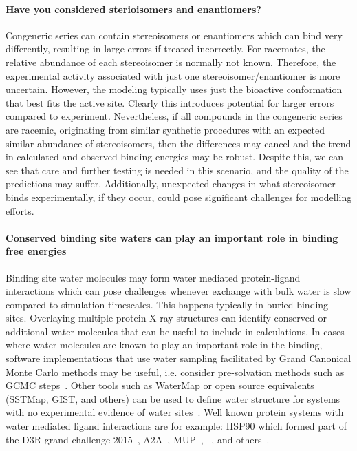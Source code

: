 \documentclass[9pt,bestpractices]{livecoms}
\begin{document}
\paragraph{Have you considered sterioisomers and enantiomers?}
Congeneric series can contain stereoisomers or enantiomers which can bind very differently, resulting in large errors if treated incorrectly. For racemates, the relative abundance of each stereoisomer is normally not known. Therefore, the experimental activity associated with just one stereoisomer/enantiomer is more uncertain. However, the modeling typically uses just the bioactive conformation that best fits the active site. Clearly this introduces potential for larger errors compared to experiment. Nevertheless, if all compounds in the congeneric series are racemic, originating from similar synthetic procedures with an expected similar abundance of stereoisomers, then the differences may cancel and the trend in calculated and observed binding energies may be robust. Despite this, we can see that care and further testing is needed in this scenario, and the quality of the predictions may suffer. Additionally, unexpected changes in what stereoisomer binds experimentally, if they occur, could pose significant challenges for modelling efforts.

\paragraph{Conserved binding site waters can play an important role in binding free energies}
Binding site water molecules may form water mediated protein-ligand interactions which can pose challenges whenever exchange with bulk water is slow compared to simulation timescales. This happens typically in buried binding sites. Overlaying multiple protein X-ray structures can identify conserved or additional water molecules that can be useful to include in calculations. In cases where water molecules are known to play an important role in the binding, software implementations that use water sampling facilitated by Grand Canonical Monte Carlo methods may be useful, i.e. consider pre-solvation methods such as GCMC steps~\cite{michel2010prediction}. Other tools such as WaterMap or open source equivalents (SSTMap, GIST, and others) can be used to define water structure for systems with no experimental evidence of water sites~\cite{wang2011ligand}. Well known protein systems with water mediated ligand interactions are for example: HSP90 which formed part of the D3R grand challenge 2015~\cite{mey2016blinded}, A2A~\cite{brucemacdonald2018ligand}, MUP~\cite{ross2015water}, ~\cite{deflorian2020accurate}, and others~\cite{michel2009energetics}.
\end{document}
